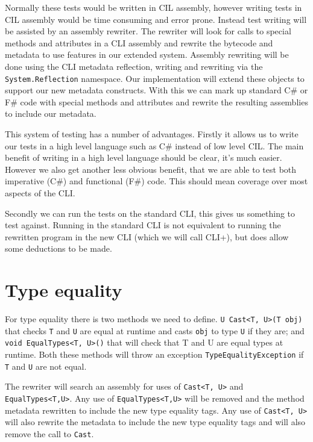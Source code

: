 Normally these tests would be written in CIL assembly, however writing tests in
CIL assembly would be time consuming and error prone. Instead test writing will
be assisted by an assembly rewriter. The rewriter will look for calls to
special methods and attributes in a CLI assembly and rewrite the bytecode and
metadata to use features in our extended system.  Assembly rewriting will be
done using the CLI metadata reflection, writing and rewriting via the
\texttt{System.Reflection} namespace.  Our implementation will extend these
objects to support our new metadata constructs. With this we can mark up
standard C\# or F\# code with special methods and attributes and rewrite the
resulting assemblies to include our metadata.

This system of testing has a number of advantages. Firstly it allows us to
write our tests in a high level language such as C\# instead of low level CIL.
The main benefit of writing in a high level language should be clear, it's much
easier. However we also get another less obvious benefit, that we are able to
test both imperative (C\#) and functional (F\#) code. This should mean coverage
over most aspects of the CLI.

Secondly we can run the tests on the standard CLI, this gives us something to
test against. Running in the standard CLI is not equivalent to running the
rewritten program in the new CLI (which we will call CLI+), but does allow some
deductions to be made.

\section{Type equality}

For type equality there is two methods we need to define. \texttt{U Cast<T,
U>(T obj)} that checks \texttt{T} and \texttt{U} are equal at runtime and casts
\texttt{obj} to type \texttt{U} if they are; and \texttt{void EqualTypes<T,
U>()} that will check that T and U are equal types at runtime. Both these
methods will throw an exception \texttt{TypeEqualityException} if \texttt{T}
and \texttt{U} are not equal.

The rewriter will search an assembly for uses of \texttt{Cast<T, U>} and
\texttt{EqualTypes<T,U>}. Any use of \texttt{EqualTypes<T,U>} will be removed
and the method metadata rewritten to include the new type equality tags. Any
use of \texttt{Cast<T, U>} will also rewrite the metadata to include the new
type equality tags and will also remove the call to \texttt{Cast}.

